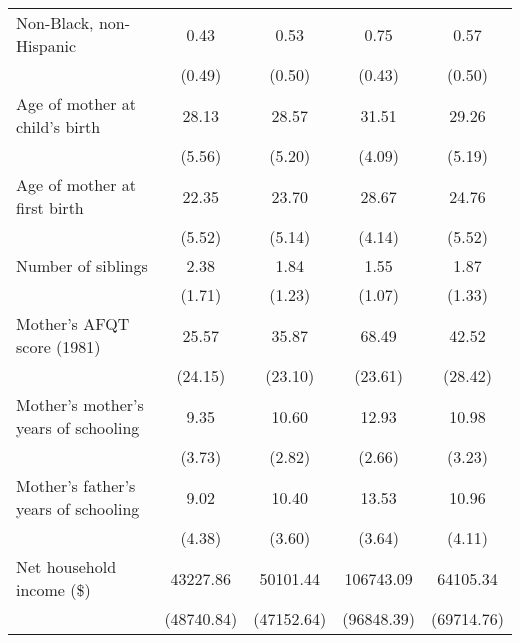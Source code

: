 \begin{table}[!htbp]
\begin{tabular}{l*{4}{c}}
\addlinespace
Non-Black, non-Hispanic&        0.43&        0.53&        0.75&        0.57\\
                    &      (0.49)&      (0.50)&      (0.43)&      (0.50)\\
\addlinespace
Age of mother at child's birth&       28.13&       28.57&       31.51&       29.26\\
                    &      (5.56)&      (5.20)&      (4.09)&      (5.19)\\
\addlinespace
Age of mother at first birth&       22.35&       23.70&       28.67&       24.76\\
                    &      (5.52)&      (5.14)&      (4.14)&      (5.52)\\
\addlinespace
Number of siblings  &        2.38&        1.84&        1.55&        1.87\\
                    &      (1.71)&      (1.23)&      (1.07)&      (1.33)\\
\addlinespace
Mother's AFQT score (1981)&       25.57&       35.87&       68.49&       42.52\\
                    &     (24.15)&     (23.10)&     (23.61)&     (28.42)\\
\addlinespace
Mother's mother's years of schooling&        9.35&       10.60&       12.93&       10.98\\
                    &      (3.73)&      (2.82)&      (2.66)&      (3.23)\\
\addlinespace
Mother's father's years of schooling&        9.02&       10.40&       13.53&       10.96\\
                    &      (4.38)&      (3.60)&      (3.64)&      (4.11)\\
\addlinespace
Net household income (\$)&    43227.86&    50101.44&   106743.09&    64105.34\\
                    &  (48740.84)&  (47152.64)&  (96848.39)&  (69714.76)\\
\bottomrule
\end{tabular}
\end{table}
